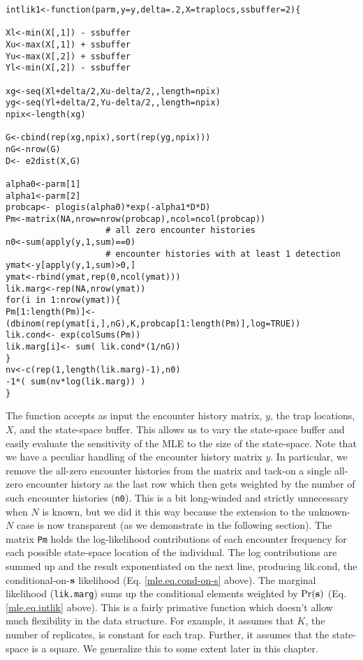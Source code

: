 {\small 
\begin{verbatim}
intlik1<-function(parm,y=y,delta=.2,X=traplocs,ssbuffer=2){

Xl<-min(X[,1]) - ssbuffer 
Xu<-max(X[,1]) + ssbuffer
Yu<-max(X[,2]) + ssbuffer
Yl<-min(X[,2]) - ssbuffer

xg<-seq(Xl+delta/2,Xu-delta/2,,length=npix) 
yg<-seq(Yl+delta/2,Yu-delta/2,,length=npix) 
npix<-length(xg)

G<-cbind(rep(xg,npix),sort(rep(yg,npix)))
nG<-nrow(G)
D<- e2dist(X,G)  

alpha0<-parm[1]
alpha1<-parm[2]
probcap<- plogis(alpha0)*exp(-alpha1*D*D)
Pm<-matrix(NA,nrow=nrow(probcap),ncol=ncol(probcap))
                    # all zero encounter histories
n0<-sum(apply(y,1,sum)==0) 
                    # encounter histories with at least 1 detection
ymat<-y[apply(y,1,sum)>0,] 
ymat<-rbind(ymat,rep(0,ncol(ymat)))
lik.marg<-rep(NA,nrow(ymat))
for(i in 1:nrow(ymat)){
Pm[1:length(Pm)]<- (dbinom(rep(ymat[i,],nG),K,probcap[1:length(Pm)],log=TRUE))
lik.cond<- exp(colSums(Pm))
lik.marg[i]<- sum( lik.cond*(1/nG))  
}
nv<-c(rep(1,length(lik.marg)-1),n0)
-1*( sum(nv*log(lik.marg)) )
}
\end{verbatim}
}


The function accepts as
input the encounter history matrix, $y$, the trap locations, $X$, and the
state-space buffer. This allows us to vary the state-space buffer and
easily evaluate the sensitivity of the MLE to the size of the
state-space. 
Note that we have a peculiar handling of the encounter history
matrix $y$. In particular, we remove the all-zero encounter histories
from the matrix and tack-on a single all-zero encounter history as the
last row which then gets weighted by the number of such encounter
histories (\mbox{\tt n0}). This is a bit long-winded and strictly unnecessary
when $N$ is known, but we did it this way because the extension to the
unknown-$N$ case is now transparent (as we demonstrate in the following
section). 
 The matrix \mbox{\tt Pm} holds the log-likelihood contributions of
each encounter frequency for each possible state-space location of the
individual. 
The log contributions are summed up and the result
exponentiated on the next line, producing lik.cond, the
conditional-on-${\bf s}$ likelihood (Eq. \ref{mle.eq.cond-on-s}
above). The marginal
likelihood (\mbox{\tt lik.marg}) sums up the conditional elements weighted by
$\Pr({\bf s})$ (Eq. \ref{mle.eq.intlik} above).
This is a fairly primative function which doesn't allow much
flexibility in the data structure. For example, it assumes that $K$,
the number 
of replicates, is constant for each trap. Further, it assumes that the
state-space is a square. We generalize this to some extent later in
this chapter. 

